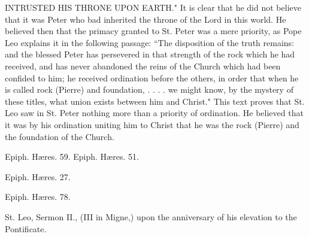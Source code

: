 INTRUSTED HIS THRONE UPON EARTH." It is clear that he did not believe that it was Peter who bad inherited the throne of the Lord in this world. He believed then that the primacy granted to St. Peter was a mere priority, as Pope Leo explains it in the following passage: “The disposition of the truth remains: and the blessed Peter has persevered in that strength of the rock which he had received, and has never abandoned the reins of the Church which had been confided to him; he received ordination before the others, in order that when he is called rock (Pierre) and foundation, . . . . we might know, by the mystery of these titles, what union exists between him and Christ." This text proves that St. Leo saw in St. Peter nothing more than a priority of ordination. He believed that it was by his ordination uniting him to Christ that he was the rock (Pierre) and the foundation of the Church.

Epiph. Hæres. 59. Epiph. Hæres. 51.

Epiph. Hæres. 27.

Epiph. Hæres. 78.

St. Leo, Sermon II., (III in Migne,) upon the anniversary of his elevation to the Pontificate.

